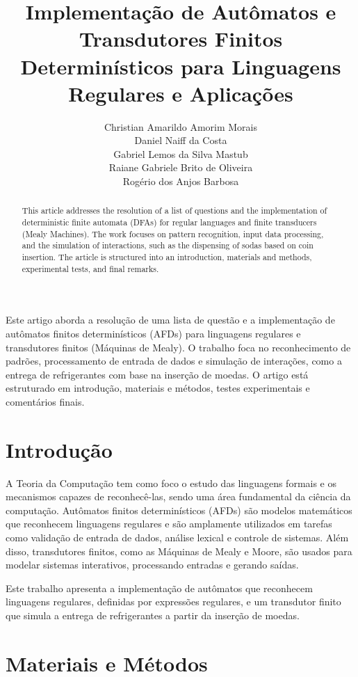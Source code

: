 \documentclass[12pt]{article}
\title{Implementação de Autômatos e Transdutores Finitos Determinísticos para Linguagens Regulares e Aplicações}
\author{Christian Amarildo Amorim Morais\inst{1} \\ 
        Daniel Naiff da Costa\inst{2} \\
        Gabriel Lemos da Silva Mastub\inst{3} \\
        Raiane Gabriele Brito de Oliveira \inst{4} \\
        Rogério dos Anjos Barbosa \inst{5} \\}
\begin{document}
\maketitle

\begin{abstract}
    This article addresses the resolution of a list of questions and the implementation of deterministic finite automata (DFAs) for regular languages and finite transducers (Mealy Machines). The work focuses on pattern recognition, input data processing, and the simulation of interactions, such as the dispensing of sodas based on coin insertion. The article is structured into an introduction, materials and methods, experimental tests, and final remarks.
\end{abstract}

\begin{resumo}
  Este artigo aborda a resolução de uma lista de questão e a implementação de autômatos finitos determinísticos (AFDs) para linguagens regulares e transdutores finitos (Máquinas de Mealy). O trabalho foca no reconhecimento de padrões, processamento de entrada de dados e simulação de interações, como a entrega de refrigerantes com base na inserção de moedas. O artigo está estruturado em introdução, materiais e métodos, testes experimentais e comentários finais.
\end{resumo}

\section{\textbf{Introdução}}

A Teoria da Computação tem como foco o estudo das linguagens formais e os mecanismos capazes de reconhecê-las, sendo uma área fundamental da ciência da computação. Autômatos finitos determinísticos (AFDs) são modelos matemáticos que reconhecem linguagens regulares e são amplamente utilizados em tarefas como validação de entrada de dados, análise lexical e controle de sistemas. Além disso, transdutores finitos, como as Máquinas de Mealy e Moore, são usados para modelar sistemas interativos, processando entradas e gerando saídas.

Este trabalho apresenta a implementação de autômatos que reconhecem linguagens regulares, definidas por expressões regulares, e um transdutor finito que simula a entrega de refrigerantes a partir da inserção de moedas.

\section{\textbf{Materiais e Métodos}}
\end{document}
